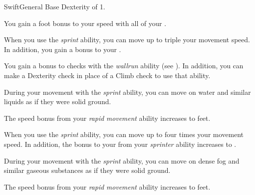     \begin{feat}{Swift}{General}
        \featpre Base Dexterity of 1.

         You gain a  foot bonus to your speed with all of your .

         When you use the \textit{sprint} ability, you can move up to triple your movement speed.
        In addition, you gain a  bonus to your .

         You gain a  bonus to checks with the \textit{wallrun} ability (see ).
        In addition, you can make a Dexterity check in place of a Climb check to use that ability.

         During your movement with the \textit{sprint} ability, you can move on water and similar liquids as if they were solid ground.

         The speed bonus from your \textit{rapid movement} ability increases to  feet.

         When you use the \textit{sprint} ability, you can move up to four times your movement speed.
        In addition, the bonus to your  from your \textit{sprinter} ability increases to .

         During your movement with the \textit{sprint} ability, you can move on dense fog and similar gaseous substances as if they were solid ground.

         The speed bonus from your \textit{rapid movement} ability increases to  feet.
    \end{feat}

